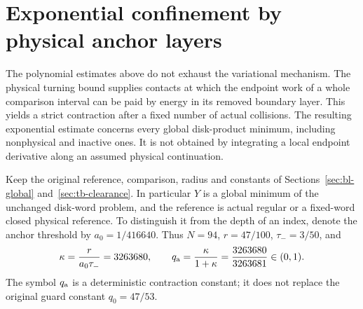 \section{Exponential confinement by physical anchor layers}
\label{sec:ae-exponential}
The polynomial estimates above do not exhaust the variational mechanism.
The physical turning bound supplies contacts at which the endpoint work
of a whole comparison interval can be paid by energy in its removed
boundary layer.  This yields a strict contraction after a fixed number
of actual collisions.  The resulting exponential estimate concerns
every global disk-product minimum, including nonphysical and inactive
ones.  It is not obtained by integrating a local endpoint derivative
along an assumed physical continuation.

Keep the original reference, comparison, radius and constants of
Sections~\ref{sec:bl-global} and~\ref{sec:tb-clearance}.  In particular
$Y$ is a global minimum of the unchanged disk-word problem, and the
reference is actual regular or a fixed-word closed physical reference.
To distinguish it from the depth of an index, denote the anchor threshold
by $a_0=1/416640$.  Thus $N=94$, $r=47/100$, $\tau_-=3/50$, and
\begin{equation}\label{eq:ae-contraction}
 \kappa=\frac{r}{a_0\tau_-}=3263680,
 \qquad q_{\rm a}=\frac{\kappa}{1+\kappa}
                 =\frac{3263680}{3263681}\in(0,1).
\end{equation}
The symbol $q_{\rm a}$ is a deterministic contraction constant; it
does not replace the original guard constant $q_0=47/53$.

